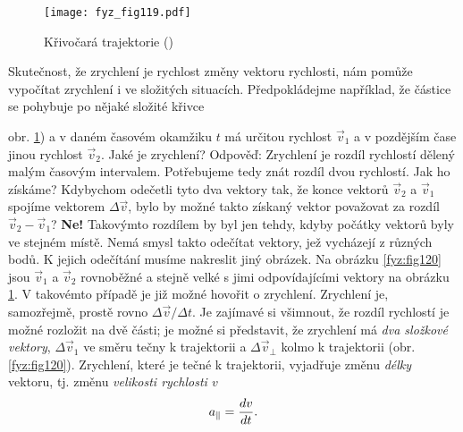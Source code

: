 {    \begin{figure}[ht!]  %
      \centering
      \texttt{[image: fyz\_fig119.pdf]}
      \caption{Křivočará trajektorie
              (\cite[s.~163]{Feynman01})}
      \label{fyz:fig119}
    \end{figure}
    Skutečnost, že zrychlení je rychlost změny vektoru rychlosti, nám pomůže vypočítat zrychlení i 
    ve složitých situacích. Předpokládejme například, že částice se pohybuje po nějaké složité 
    křivce {obr. \ref{fyz:fig119}) a v daném časovém okamžiku \(t\) má určitou rychlost 
    \(\vec{v}_1\) a v pozdějším čase jinou rychlost \(\vec{v}_2\). Jaké je zrychlení? Odpověď: 
    Zrychlení je rozdíl rychlostí dělený malým časovým intervalem. Potřebujeme tedy znát rozdíl 
    dvou rychlostí. Jak ho získáme? Kdybychom odečetli tyto dva vektory tak, že konce vektorů 
    \(\vec{v}_2\) a \(\vec{v}_1\) spojíme vektorem \(\Delta \vec{v}\), bylo by možné takto získaný 
    vektor považovat za rozdíl \(\vec{v}_2 - \vec{v}_1\)? \textbf{Ne!} Takovýmto rozdílem by byl 
    jen tehdy, kdyby počátky vektorů byly ve stejném místě. Nemá smysl takto odečítat vektory, jež 
    vycházejí z různých bodů. K jejich odečítání musíme nakreslit jiný obrázek. Na obrázku 
    \ref{fyz:fig120} jsou \(\vec{v}_1\) a \(\vec{v}_2\) rovnoběžné a stejně velké s jimi 
    odpovídajícími vektory na obrázku \ref{fyz:fig119}. V takovémto případě je již možné hovořit o 
    zrychlení. Zrychlení je, samozřejmě, prostě rovno \(\Delta\vec{v}/\Delta t\). Je zajímavé si 
    všimnout, že rozdíl rychlostí je možné rozložit na dvě části; je možné si představit, že 
    zrychlení má \emph{dva složkové vektory}, \(\Delta\vec{v}_1\) ve směru tečny k trajektorii a 
    \(\Delta\vec{v}_\perp\) kolmo k trajektorii (obr. \ref{fyz:fig120}). Zrychlení, které je tečné 
    k trajektorii, vyjadřuje změnu \emph{délky} vektoru, tj. změnu \emph{velikosti rychlosti \(v\)}
    \begin{equation}\label{FYZ:eq153}
      a_\parallel = \frac{d v}{d t}.
    \end{equation}

}}
